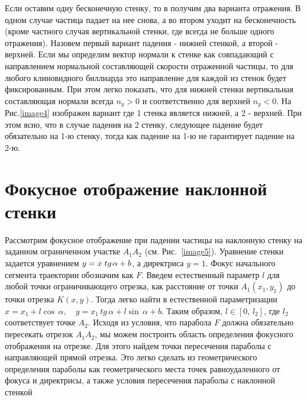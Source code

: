 \documentclass[a4paper]{article}
\begin{document}
 Если оставим одну бесконечную стенку, то в получим два варианта отражения. В одном случае частица   падает на нее снова, а во втором уходит на бесконечность (кроме частного случая вертикальной стенки, где всегда не больше одного отражения).
 Назовем первый вариант падения - нижней стенкой, а второй - верхней. Если мы определим вектор нормали к стенке как совпадающий с направлением нормальной составляющей скорости отраженной частицы, то для любого клиновидного биллиарда это направление для каждой из стенок будет фиксированным. При этом легко показать, что для нижней стенки вертикальная составляющая нормали всегда $n_y>0$ и соответственно для верхней $n_y<0$. На  Рис.\ref{image4} изображен вариант где 1 стенка является нижней, а 2 - верхней. При этом ясно, что в случае падения на 2 стенку, следующее падение будет обязательно на 1-ю стенку, тогда как падение на 1-ю не гарантирует падение на 2-ю.


\section{Фокусное отображение наклонной стенки}

Рассмотрим фокусное отображение при падении частицы на наклонную стенку на заданном ограниченном участке $A_{1} A_{2} $ (см. Рис.~\ref{image5}). Уравнение стенки задается уравнением $y=x\; tg{\kern 1pt} \alpha +b$, а директриса $y=1$. Фокус начального сегмента траектории обозначим как $F$. Введем естественный параметр $l$ для любой точки ограничивающего отрезка, как расстояние от точки $A_{1} \left(x_{1} ,y_{1} \right)$ до точки отрезка $K\left(x,y\right)$. Тогда легко найти в естественной параметризации $x=x_{1} +l\cos \, \alpha ,\quad y=x_{1} \, tg\, \alpha +l\sin \, \alpha +b$. Таким образом, $l\in \left[0,\, l_{2} \right]$, где $l_{2} $ соответствует точке $A_{2} $. Исходя из условия, что парабола $F$ должна обязательно пересекать отрезок $A_{1} A_{2} $, мы можем построить область определения фокусного отображения на отрезке. Для этого найдем точки пересечения параболы с направляющей прямой отрезка. Это легко сделать из геометрического определения параболы как геометрического места точек равноудаленного от фокуса и директрисы, а также условия пересечения параболы с наклонной стенкой
\end{document}
